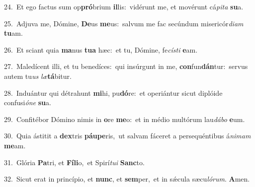 {\numbfont\textcolor{\numbcolor}{24.}}~Et ego factus sum op\-\textbf{pró}\-brium \textbf{il}\-lis:~\star vidérunt me, et movérunt cá\-\textit{pi}\-\textit{ta} \textbf{su}\-a.\par
{\numbfont\textcolor{\numbcolor}{25.}}~Adjuva me, Dómine, \textbf{De}\-us \textbf{me}\-us:~\star salvum me fac secúndum misericór\-\textit{di}\-\textit{am} \textbf{tu}\-am.\par
{\numbfont\textcolor{\numbcolor}{26.}}~Et sciant quia \textbf{ma}\-nus \textbf{tu}\-\textbf{a} hæc:~\star et tu, Dómine, fe\-\textit{cís}\-\textit{ti} \textbf{e}\-am.\par
{\numbfont\textcolor{\numbcolor}{27.}}~Maledícent illi, et tu benedíces:~\dagger qui insúrgunt in me, \textbf{con}\-fun\-\textbf{dán}\-tur:~\star servus autem tu\textit{us} \textit{læ}\-\textbf{tá}bitur.\par
{\numbfont\textcolor{\numbcolor}{28.}}~Induántur qui détrahunt \textbf{mi}\-hi, pu\-\textbf{dó}\-re:~\star et operiántur sicut diplóide confusi\-\textit{ó}\-\textit{ne} \textbf{su}\-a.\par
{\numbfont\textcolor{\numbcolor}{29.}}~Confitébor Dómino nimis in \textbf{o}\-re \textbf{me}\-o:~\star et in médio multórum lau\-\textit{dá}\-\textit{bo} \textbf{e}\-um.\par
{\numbfont\textcolor{\numbcolor}{30.}}~Quia ástitit a \textbf{dex}\-tris \textbf{páu}\-\textbf{pe}ris,~\star ut salvam fáceret a persequéntibus á\-\textit{ni}\-\textit{mam} \textbf{me}\-am.\par
{\numbfont\textcolor{\numbcolor}{31.}}~Glória \textbf{Pa}\-tri, et \textbf{Fí}\-\textbf{li}o,~\star et Spirí\-\textit{tu}\-\textit{i} \textbf{Sanc}\-to.\par
{\numbfont\textcolor{\numbcolor}{32.}}~Sicut erat in princípio, et \textbf{nunc}\-, et \textbf{sem}\-per,~\star et in sǽcula sæcu\-\textit{ló}\-\textit{rum}. \textbf{A}\-men.\par
